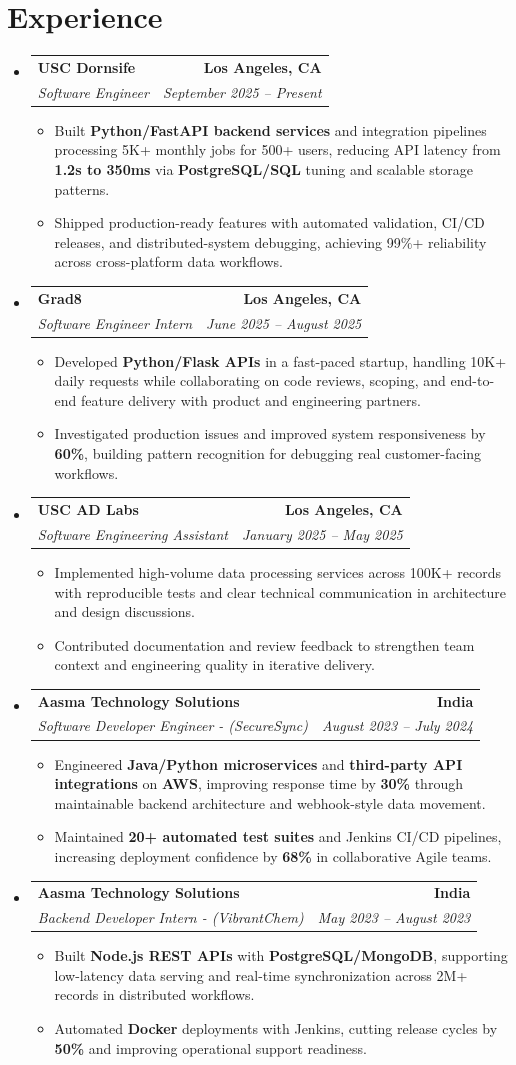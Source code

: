 \documentclass[letterpaper,10pt]{article}
\makeatletter
\newcommand{\resumeItem}[1]{\item\small{{#1 \vspace{-2pt}}}}
\newcommand{\resumeSubheading}[4]{\vspace{-1pt}\item\begin{tabular*}{1.0\textwidth}[t]{l@{\extracolsep{\fill}}r}\textbf{#1} & \textbf{\small #2} \\\textit{\small#3} & \textit{\small #4} \\\end{tabular*}\vspace{-2pt}}
\newcommand{\resumeSubHeadingListStart}{\begin{itemize}[leftmargin=0.0in, label={}]}
\newcommand{\resumeSubHeadingListEnd}{\end{itemize}}
\newcommand{\resumeItemListStart}{\begin{itemize}[leftmargin=0.15in,label=\textbullet,itemsep=2pt,topsep=0pt,parsep=0pt,partopsep=0pt]}
\newcommand{\resumeItemListEnd}{\end{itemize}\vspace{-4pt}}
\makeatother
\begin{document}
\section{Experience}
\resumeSubHeadingListStart
\resumeSubheading{USC Dornsife}{Los Angeles, CA}{Software Engineer}{September 2025 -- Present}
\resumeItemListStart
\resumeItem{Built \textbf{Python/FastAPI backend services} and integration pipelines processing 5K+ monthly jobs for 500+ users, reducing API latency from \textbf{1.2s to 350ms} via \textbf{PostgreSQL/SQL} tuning and scalable storage patterns.}
\resumeItem{Shipped production-ready features with automated validation, CI/CD releases, and distributed-system debugging, achieving 99\%+ reliability across cross-platform data workflows.}
\resumeItemListEnd
\resumeSubheading{Grad8}{Los Angeles, CA}{Software Engineer Intern}{June 2025 -- August 2025}
\resumeItemListStart
\resumeItem{Developed \textbf{Python/Flask APIs} in a fast-paced startup, handling 10K+ daily requests while collaborating on code reviews, scoping, and end-to-end feature delivery with product and engineering partners.}
\resumeItem{Investigated production issues and improved system responsiveness by \textbf{60\%}, building pattern recognition for debugging real customer-facing workflows.}
\resumeItemListEnd
\resumeSubheading{USC AD Labs}{Los Angeles, CA}{Software Engineering Assistant}{January 2025 -- May 2025}
\resumeItemListStart
\resumeItem{Implemented high-volume data processing services across 100K+ records with reproducible tests and clear technical communication in architecture and design discussions.}
\resumeItem{Contributed documentation and review feedback to strengthen team context and engineering quality in iterative delivery.}
\resumeItemListEnd
\resumeSubheading{Aasma Technology Solutions}{India}{Software Developer Engineer - (SecureSync)}{August 2023 -- July 2024}
\resumeItemListStart
\resumeItem{Engineered \textbf{Java/Python microservices} and \textbf{third-party API integrations} on \textbf{AWS}, improving response time by \textbf{30\%} through maintainable backend architecture and webhook-style data movement.}
\resumeItem{Maintained \textbf{20+ automated test suites} and Jenkins CI/CD pipelines, increasing deployment confidence by \textbf{68\%} in collaborative Agile teams.}
\resumeItemListEnd
\resumeSubheading{Aasma Technology Solutions}{India}{Backend Developer Intern - (VibrantChem)}{May 2023 -- August 2023}
\resumeItemListStart
\resumeItem{Built \textbf{Node.js REST APIs} with \textbf{PostgreSQL/MongoDB}, supporting low-latency data serving and real-time synchronization across 2M+ records in distributed workflows.}
\resumeItem{Automated \textbf{Docker} deployments with Jenkins, cutting release cycles by \textbf{50\%} and improving operational support readiness.}
\resumeItemListEnd
\resumeSubHeadingListEnd
\vspace{-14pt}
\end{document}
